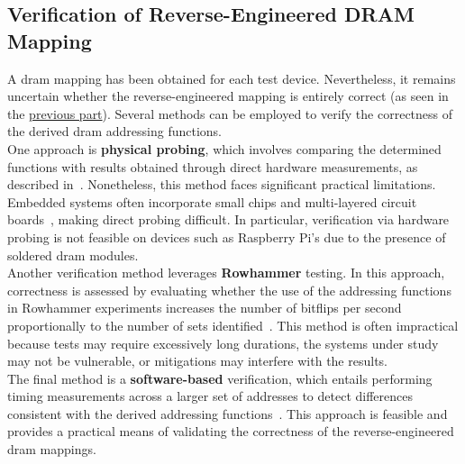 \subsection{Verification of Reverse-Engineered DRAM Mapping} \label{subsec:verification}
    A \gls{dram} mapping has been obtained for each test device. Nevertheless, it remains uncertain whether 
    the reverse-engineered mapping is entirely correct (as seen in the
    \hyperref[subsubsec:bank-function-derivation]{previous part}). Several methods can be employed 
    to verify the correctness of the derived \gls{dram} addressing functions.
    \\
    One approach is \textbf{physical probing}, which involves comparing the determined functions with results 
    obtained through direct hardware measurements, as described in~\cite{paperDRAMA}. Nonetheless, this method faces 
    significant practical limitations. Embedded systems often incorporate small chips and 
    multi-layered circuit boards~\cite{thesisDRAMA}, making direct probing difficult. In particular, verification 
    via hardware probing is not feasible on devices such as Raspberry Pi's due to the presence of 
    soldered \gls{dram} modules.
    \\
    Another verification method leverages \textbf{Rowhammer} testing. In this approach, correctness is 
    assessed by evaluating whether the use of the addressing functions in Rowhammer experiments 
    increases the number of bitflips per second proportionally to the number of sets identified~\cite{paperDRAMA}. 
    This method is often impractical because tests may require excessively long durations, the systems 
    under study may not be vulnerable, or mitigations may interfere with the results.
    \\
    The final method is a \textbf{software-based} verification, which entails performing timing measurements 
    across a larger set of addresses to detect differences consistent with the derived addressing 
    functions~\cite{paperDRAMA, paperVerifingAddressing}. This approach is feasible and provides a practical means of validating the 
    correctness of the reverse-engineered \gls{dram} mappings.

